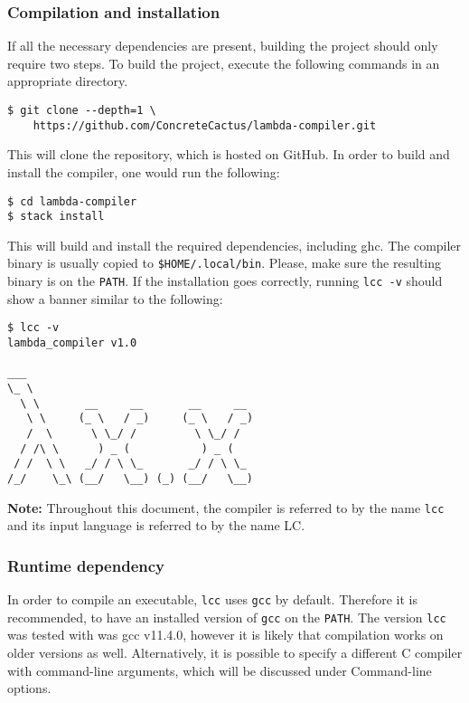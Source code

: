 \documentclass[12pt]{article}
\begin{document}
\subsubsection{Compilation and installation}

If all the necessary dependencies are present, building the project should only
require two steps. To build the project, execute the following commands in an
appropriate directory.

\begin{verbatim}
$ git clone --depth=1 \
    https://github.com/ConcreteCactus/lambda-compiler.git
\end{verbatim}

This will clone the repository, which is hosted on GitHub. In order to build and
install the compiler, one would run the following:

\begin{verbatim}
$ cd lambda-compiler
$ stack install
\end{verbatim}

This will build and install the required dependencies, including ghc. The
compiler binary is usually copied to \texttt{\$HOME/.local/bin}. Please, make
sure the resulting binary is on the \texttt{PATH}. If the installation goes
correctly, running \texttt{lcc -v} should show a banner similar to the
following:

\begin{verbatim}
$ lcc -v
lambda_compiler v1.0

___
\_ \
  \ \       __     __       __     __
   \ \     (_ \   / _)     (_ \   / _)
   /  \      \ \_/ /         \ \_/ /
  / /\ \      ) _ (           ) _ (
 / /  \ \   _/ / \ \_       _/ / \ \_
/_/    \_\ (__/   \__) (_) (__/   \__)
\end{verbatim}

\textbf{Note:} Throughout this document, the compiler is referred to by the name
\texttt{lcc} and its input language is referred to by the name LC.

\subsubsection{Runtime dependency}

In order to compile an executable, \texttt{lcc} uses \texttt{gcc} by default.
Therefore it is recommended, to have an installed version of \texttt{gcc} on the
\texttt{PATH}. The version \texttt{lcc} was tested with was gcc v11.4.0, however
it is likely that compilation works on older versions as well. Alternatively, it
is possible to specify a different C compiler with command-line arguments, which
will be discussed under Command-line options.
\end{document}
